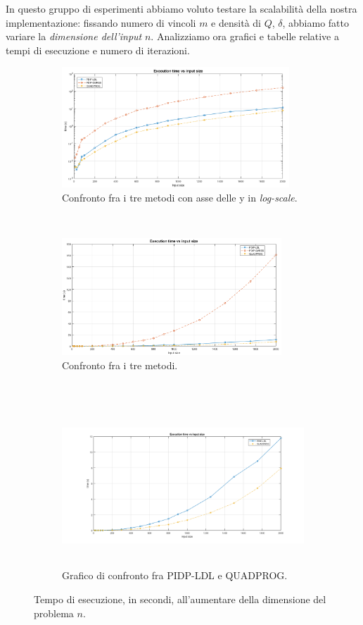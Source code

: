  In questo gruppo di esperimenti abbiamo voluto testare la scalabilità della nostra implementazione: fissando numero di vincoli $m$ e densità di $Q$, $\delta$, abbiamo fatto variare la \textit{dimensione dell'input} $n$. Analizziamo ora grafici e tabelle relative a tempi di esecuzione e numero di iterazioni. 

\begin{figure}[h!]
    \centering
    \begin{subfigure}[h]{0.5\textwidth}
        \centering
        \includegraphics[height=4.52cm]{img/MU1.png}
    \caption{Confronto fra i tre metodi con asse delle y in \textit{log-scale}.\label{fig:exp111}}
    \end{subfigure}%
    ~ 
    \begin{subfigure}[h]{0.5\textwidth}
        \centering
                \includegraphics[height=4.4cm]{img/MU10.png}
    \caption{Confronto fra i tre metodi. \label{fig:exp112}}
    \end{subfigure}
    ~\newline
     \begin{subfigure}[h]{0.8\textwidth}
        \centering
                \includegraphics[height=6cm]{img/MU11.png}
    \caption{Grafico di confronto fra PIDP-LDL e QUADPROG. \label{fig:exp113}}
    \end{subfigure}
    \caption{Tempo di esecuzione, in secondi, all'aumentare della dimensione del problema $n$. \label{fig:exp1}}
\end{figure}



